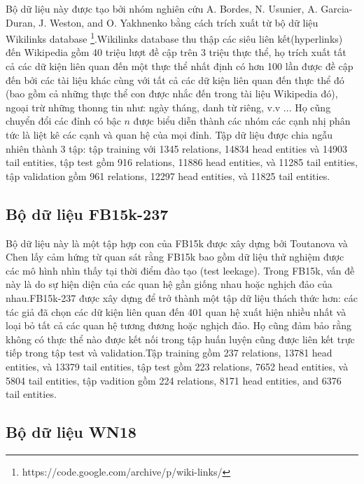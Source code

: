 Bộ dữ liệu này được tạo bởi nhóm nghiên cứu A. Bordes, N. Usunier, A. Garcia-Duran, J. Weston, and O. Yakhnenko \cite{bordes2013translating} bằng cách trích xuất từ bộ dữ liệu Wikilinks database \footnote{https://code.google.com/archive/p/wiki-links/}.Wikilinks database thu thập các siêu liên kết(hyperlinks) đến Wikipedia gồm 40 triệu lượt đề cập trên 3 triệu thực thể, họ trích xuất tất cả các dữ kiện liên quan đến một thực thể nhất định có hơn 100 lần được đề cập đến bởi các tài liệu khác cùng với tất cả các dữ kiện liên quan đến thực thể đó (bao gồm cả những thực thể con được nhắc đến trong tài liệu Wikipedia đó), ngoại trừ những thonng tin như: ngày tháng, danh từ riêng, v.v ... Họ cũng chuyển đổi các đỉnh có bậc \(n\) được biểu diễn thành các nhóm các cạnh nhị phân tức là liệt kê các cạnh và quan hệ của mọi đỉnh. Tập dữ liệu được chia ngẫu nhiên thành 3 tập: tập training với 1345 relations, 14834 head entities và 14903 tail entities, tập test gồm 916 relations, 11886 head entities, và 11285 tail entities, tập validation gồm 961 relations, 12297 head entities, và 11825 tail entities.

\subsection{Bộ dữ liệu FB15k-237}

Bộ dữ liệu này là một tập hợp con của FB15k được xây dựng bởi Toutanova và Chen \cite{toutanova2015observed} lấy cảm hứng từ quan sát rằng FB15k bao gồm dữ liệu thử nghiệm được các mô hình nhìn thấy tại thời điểm đào tạo (test leekage). Trong FB15k, vấn đề này là do sự hiện diện của các quan hệ gần giống nhau hoặc nghịch đảo của nhau.FB15k-237 được xây dựng để trở thành một tập dữ liệu thách thức hơn: các tác giả đã chọn các dữ kiện liên quan đến 401 quan hệ xuất hiện nhiều nhất và loại bỏ tất cả các quan hệ tương đương hoặc nghịch đảo. Họ cũng đảm bảo rằng không có thực thể nào được kết nối trong tập huấn luyện cũng được liên kết trực tiếp trong tập test và validation.Tập training gồm 237 relations, 13781 head entities, và 13379 tail entities, tập test gồm 223 relations, 7652 head entities, và 5804 tail entities, tập vadition gồm 224 relations, 8171 head entities, and 6376 tail entities.

\subsection{Bộ dữ liệu WN18}

